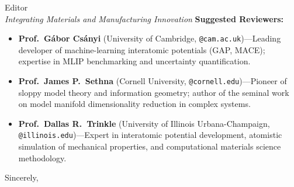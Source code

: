 \documentclass[11pt]{letter}
\begin{document}
\begin{letter}{Editor\\\textit{Integrating Materials and Manufacturing Innovation}}
\textbf{Suggested Reviewers:}
\begin{itemize}
    \item \textbf{Prof.\ G{\'a}bor Cs{\'a}nyi} (University of Cambridge, \texttt{@cam.ac.uk})---Leading developer of machine-learning interatomic potentials (GAP, MACE); expertise in MLIP benchmarking and uncertainty quantification.
    \item \textbf{Prof.\ James P.\ Sethna} (Cornell University, \texttt{@cornell.edu})---Pioneer of sloppy model theory and information geometry; author of the seminal work on model manifold dimensionality reduction in complex systems.
    \item \textbf{Prof.\ Dallas R.\ Trinkle} (University of Illinois Urbana-Champaign, \texttt{@illinois.edu})---Expert in interatomic potential development, atomistic simulation of mechanical properties, and computational materials science methodology.
\end{itemize}

\closing{Sincerely,}

\end{letter}
\end{document}
